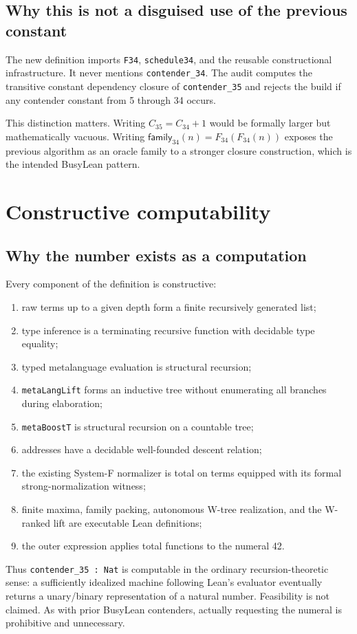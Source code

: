 \documentclass[11pt]{article}
\theoremstyle{definition}
\newcommand{\code}[1]{\texttt{#1}}
\begin{document}
\subsection{Why this is not a disguised use of the previous constant}

The new definition imports \code{F34}, \code{schedule34}, and the reusable
constructional infrastructure.  It never mentions \code{contender\_34}.  The
audit computes the transitive constant dependency closure of
\code{contender\_35} and rejects the build if any contender constant from 5
through 34 occurs.

This distinction matters.  Writing \(C_{35}=C_{34}+1\) would be formally
larger but mathematically vacuous.  Writing
\(\mathsf{family}_{34}(n)=F_{34}(F_{34}(n))\) exposes the previous algorithm as
an oracle family to a stronger closure construction, which is the intended
BusyLean pattern.

\section{Constructive computability}

\subsection{Why the number exists as a computation}

Every component of the definition is constructive:
\begin{enumerate}[leftmargin=2.3em]
  \item raw terms up to a given depth form a finite recursively generated list;
  \item type inference is a terminating recursive function with decidable type
  equality;
  \item typed metalanguage evaluation is structural recursion;
  \item \code{metaLangLift} forms an inductive tree without enumerating all
  branches during elaboration;
  \item \code{metaBoostT} is structural recursion on a countable tree;
  \item addresses have a decidable well-founded descent relation;
  \item the existing System-F normalizer is total on terms equipped with its
  formal strong-normalization witness;
  \item finite maxima, family packing, autonomous W-tree realization, and the
  W-ranked lift are executable Lean definitions;
  \item the outer expression applies total functions to the numeral 42.
\end{enumerate}
Thus \code{contender\_35 : Nat} is computable in the ordinary recursion-theoretic
sense: a sufficiently idealized machine following Lean's evaluator eventually
returns a unary/binary representation of a natural number.  Feasibility is not
claimed.  As with prior BusyLean contenders, actually requesting the numeral is
prohibitive and unnecessary.
\end{document}
